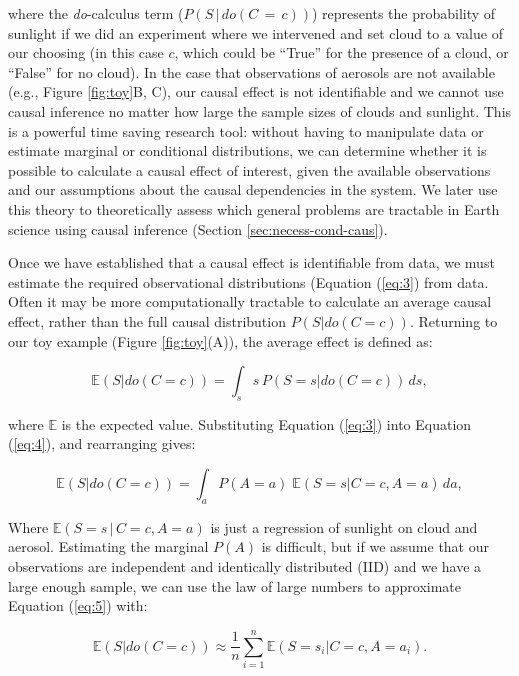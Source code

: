 \documentclass[12pt]{article}
\begin{document}
where the \textit{do}-calculus \citep{pearl2009} term
($P(S \, | \, do(C\, = \,c))$) represents the probability of sunlight
if we did an experiment where we intervened and set cloud to a value
of our choosing (in this case $c$, which could be ``True'' for the
presence of a cloud, or ``False'' for no cloud). In the case that
observations of aerosols are not available (e.g., Figure
\ref{fig:toy}B, C), our causal effect is not identifiable and we
cannot use causal inference no matter how large the sample sizes of
clouds and sunlight. This is a powerful time saving research tool:
without having to manipulate data or estimate marginal or conditional
distributions, we can determine whether it is possible to calculate a
causal effect of interest, given the available observations and our
assumptions about the causal dependencies in the system.  We later use
this theory to theoretically assess which general problems are
tractable in Earth science using causal inference (Section
\ref{sec:necess-cond-caus}).

Once we have established that a causal effect is identifiable from
data, we must estimate the required observational distributions
(Equation (\ref{eq:3}) from data. Often it may be more computationally
tractable to calculate an average causal effect, rather than the full
causal distribution $P(S | do(C=c))$. Returning to our toy example
(Figure \ref{fig:toy}(A)), the average effect is defined as:

\begin{equation}
  \mathbb{E}(S | do(C = c)) = \int_{s} s \, P(S = s
  | do(C=c)) \, ds,
  \label{eq:4}
\end{equation}

where $\mathbb{E}$ is the expected value. Substituting Equation
(\ref{eq:3}) into Equation (\ref{eq:4}), and rearranging gives:

\begin{equation}
  \mathbb{E}(S | do(C = c))  = \int_{a} P(A=a) \; \mathbb{E}(S=s |
  C=c, A=a) \, d a,
  \label{eq:5}
\end{equation}

Where $\mathbb{E}(S=s \, | \, C=c, A=a)$ is just a regression of sunlight on
cloud and aerosol. Estimating the marginal $P(A)$ is difficult, but
if we assume that our observations are independent and identically
distributed (IID) and we have a large enough sample, we can use the
law of large numbers to approximate Equation (\ref{eq:5}) with:

\begin{equation}
  \mathbb{E}(S | do(C = c))  \approx \frac{1}{n} \sum_{i=1}^n \mathbb{E}(S=s_i |
  C=c, A=a_i).
  \label{eq:6}
\end{equation}
\end{document}
